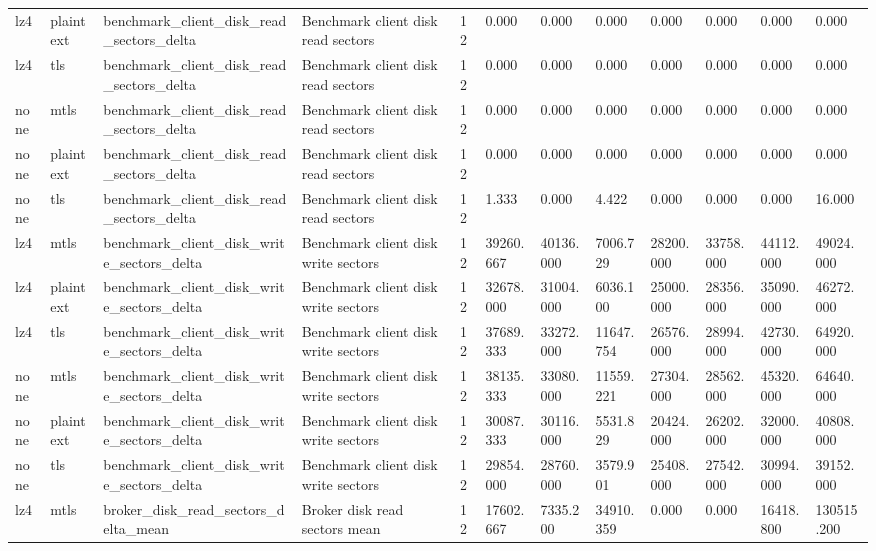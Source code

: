 \begin{longtable}{llllllllllll}
lz4 & plaintext & benchmark\_client\_disk\_read\_sectors\_delta & Benchmark client disk read sectors & 12 & 0.000 & 0.000 & 0.000 & 0.000 & 0.000 & 0.000 & 0.000 \\
lz4 & tls & benchmark\_client\_disk\_read\_sectors\_delta & Benchmark client disk read sectors & 12 & 0.000 & 0.000 & 0.000 & 0.000 & 0.000 & 0.000 & 0.000 \\
none & mtls & benchmark\_client\_disk\_read\_sectors\_delta & Benchmark client disk read sectors & 12 & 0.000 & 0.000 & 0.000 & 0.000 & 0.000 & 0.000 & 0.000 \\
none & plaintext & benchmark\_client\_disk\_read\_sectors\_delta & Benchmark client disk read sectors & 12 & 0.000 & 0.000 & 0.000 & 0.000 & 0.000 & 0.000 & 0.000 \\
none & tls & benchmark\_client\_disk\_read\_sectors\_delta & Benchmark client disk read sectors & 12 & 1.333 & 0.000 & 4.422 & 0.000 & 0.000 & 0.000 & 16.000 \\
lz4 & mtls & benchmark\_client\_disk\_write\_sectors\_delta & Benchmark client disk write sectors & 12 & 39260.667 & 40136.000 & 7006.729 & 28200.000 & 33758.000 & 44112.000 & 49024.000 \\
lz4 & plaintext & benchmark\_client\_disk\_write\_sectors\_delta & Benchmark client disk write sectors & 12 & 32678.000 & 31004.000 & 6036.100 & 25000.000 & 28356.000 & 35090.000 & 46272.000 \\
lz4 & tls & benchmark\_client\_disk\_write\_sectors\_delta & Benchmark client disk write sectors & 12 & 37689.333 & 33272.000 & 11647.754 & 26576.000 & 28994.000 & 42730.000 & 64920.000 \\
none & mtls & benchmark\_client\_disk\_write\_sectors\_delta & Benchmark client disk write sectors & 12 & 38135.333 & 33080.000 & 11559.221 & 27304.000 & 28562.000 & 45320.000 & 64640.000 \\
none & plaintext & benchmark\_client\_disk\_write\_sectors\_delta & Benchmark client disk write sectors & 12 & 30087.333 & 30116.000 & 5531.829 & 20424.000 & 26202.000 & 32000.000 & 40808.000 \\
none & tls & benchmark\_client\_disk\_write\_sectors\_delta & Benchmark client disk write sectors & 12 & 29854.000 & 28760.000 & 3579.901 & 25408.000 & 27542.000 & 30994.000 & 39152.000 \\
lz4 & mtls & broker\_disk\_read\_sectors\_delta\_mean & Broker disk read sectors mean & 12 & 17602.667 & 7335.200 & 34910.359 & 0.000 & 0.000 & 16418.800 & 130515.200 \\

\end{longtable}

